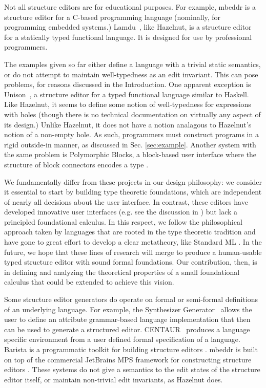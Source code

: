 \documentclass[preprint,9pt]{sigplanconf}
\begin{document}
Not all structure editors are for educational purposes. For example,
mbeddr \cite{voelter_mbeddr:_2012} is a structure editor for a C-based programming language (nominally, for programming embedded systems.)
Lamdu~\cite{lamdu}, like Hazelnut, is a structure editor for a statically typed functional language. It is designed for use by professional programmers.

The examples given so far either define a language with a trivial static semantics, or do not attempt to maintain well-typedness as an edit invariant. This can pose problems, for reasons discussed in the Introduction. One apparent exception is Unison~\cite{unison}, a structure editor for a typed functional language similar to Haskell. Like Hazelnut, it seems to define some notion of well-typedness for expressions with holes (though there is no technical documentation on virtually any aspect of its design.) Unlike Hazelnut, it does not have a notion analagous to Hazelnut's notion of a non-empty hole. As such, programmers must construct programs in a rigid outside-in manner, as discussed in Sec. \ref{sec:example}. Another system with the same problem is Polymorphic Blocks, a block-based user interface where the structure of block connectors encodes a type \cite{DBLP:conf/chi/LernerFG15}.

We fundamentally differ from these projects in our design philosophy: we consider it essential to start by building type theoretic foundations, which are independent of nearly all decisions about the user interface. In contrast, these editors have developed innovative user interfaces (e.g. see the discussion in \cite{DBLP:conf/sle/VolterSBK14}) but lack a principled foundational calculus. In this respect, we follow the philosophical approach taken by languages that are rooted in the type theoretic tradition and have gone to great effort to develop a clear metatheory, like Standard ML \cite{mthm97-for-dart,Harper00atype-theoretic}.  In the future, we hope that these lines of research will merge to produce a human-usable typed structure editor with sound formal foundations. Our contribution, then, is in defining and analyzing the theoretical properties of a small foundational calculus that could be extended to achieve this vision.

Some structure editor generators do operate on formal or semi-formal definitions of an underlying language. For example, the Synthesizer Generator~\cite{Reps:1984:SG:390010.808247} allows the user to define an attribute grammar-based language implementation that then can be used to generate a structured editor. CENTAUR~\cite{Borras:1988:CS:64140.65005} produces a language specific environment from a user defined formal specification of a language. Barista is a programmatic toolkit for building structure editors \cite{ko_barista:_2006}. mbeddr is built on top of the commercial JetBrains MPS framework for constructing structure editors \cite{voelter2011language,DBLP:journals/software/VoelterWK15}. These systems do not give a semantics to the edit states of the structure editor itself, or maintain non-trivial edit invariants, as Hazelnut does.
\end{document}
